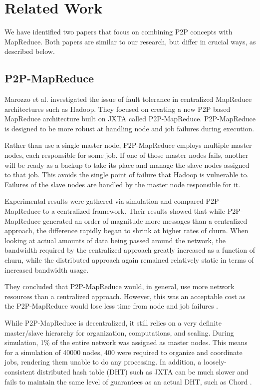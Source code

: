 \documentclass[10pt, conference, compsocconf]{IEEEtran}
\begin{document}
\section{Related Work}

We have identified two papers that focus on combining P2P concepts with MapReduce.  Both papers are similar to our research, but differ in crucial ways, as described below.


\subsection{P2P-MapReduce}
Marozzo et al. \cite{marozzo2012p2p} investigated the issue of fault tolerance in centralized MapReduce architectures such as Hadoop.  They focused on creating a new P2P based MapReduce architecture built on JXTA \cite{935182} called P2P-MapReduce.  P2P-MapReduce is designed to be more robust at handling node and job failures during execution.

Rather than use a single master node, P2P-MapReduce employs multiple master nodes, each responsible for some job.  If one of those master nodes fails, another will be ready as a backup to take its place and manage the slave nodes assigned to that job.  This avoids the single point of failure that Hadoop is vulnerable to. Failures of the slave nodes are handled by the master node responsible for it.

Experimental results were gathered via simulation and compared P2P-MapReduce to a centralized framework. Their results showed that while P2P-MapReduce generated an order of magnitude more messages than a centralized approach, the difference rapidly began to shrink at higher rates of churn.  When looking at actual amounts of data being passed around the network, the bandwidth required by the centralized approach greatly increased as a function of churn, while the distributed approach again remained relatively static in terms of increased bandwidth usage.  

They concluded that P2P-MapReduce would, in general, use more network resources than a centralized approach. However, this was an acceptable cost as the P2P-MapReduce would lose less time from node and job failures \cite{marozzo2012p2p}.

While P2P-MapReduce is decentralized, it still relies on a very definite master/slave hierarchy for organization, computations, and scaling. 
During simulation, 1\% of the entire network was assigned as master nodes. This means for a simulation of 40000 nodes, 400 were required to organize and coordinate jobs, rendering them unable to do any processing.  In addition, a loosely-consistent  distributed hash table (DHT) such as JXTA can be much slower and fails to maintain the same level of guarantees as an actual DHT, such as Chord \cite{5359174}.   
\end{document}
